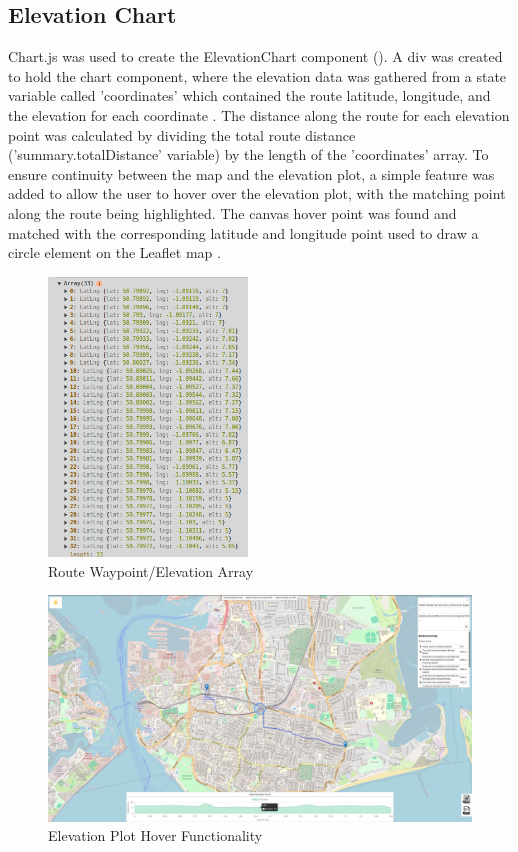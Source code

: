 \subsection{Elevation Chart}
\label{iteration1:elevation-chart}
Chart.js was used to create the ElevationChart component (\cite{noauthor_chartjs_nodate}). A div was created to hold the chart component, where the elevation data was gathered from a state variable called 'coordinates' which contained the route latitude, longitude, and the elevation for each coordinate . The distance along the route for each elevation point was calculated by dividing the total route distance ('summary.totalDistance' variable) by the length of the 'coordinates' array. To ensure continuity between the map and the elevation plot, a simple feature was added to allow the user to hover over the elevation plot, with the matching point along the route being highlighted. The canvas hover point was found and matched with the corresponding latitude and longitude point used to draw a circle element on the Leaflet map .

\begin{figure}[!ht]
    \centering
    \includegraphics[width=200px]{figures/Progress Images/Iteration-1/SR1/waypoint-arr.png}
    \caption{Route Waypoint/Elevation Array}
    \label{fig:waypoint-arr}
  \end{figure}

\begin{figure}[!ht]
    \centering
    \includegraphics[width=425px]{figures/Progress Images/Iteration-1/SR28/elevation-hover.png}
    \caption{Elevation Plot Hover Functionality}
    \label{fig:elevation-hover}
\end{figure}

